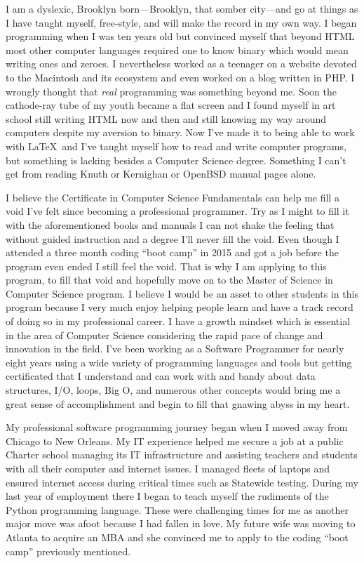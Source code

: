 \documentclass[12pt]{article}
\begin{document}
I am a dyslexic, Brooklyn born---Brooklyn, that somber city---and go at things as I have taught myself, free-style, and will make the record in my own way.
I began programming when I was ten years old but convinced myself that beyond HTML most other computer languages required one to know binary which would mean writing ones and zeroes. I nevertheless worked as a teenager on a website devoted to the Macintosh and its ecosystem and even worked on a blog written in PHP. I wrongly thought that \emph{real} programming was something beyond me. Soon the cathode-ray tube of my youth became a flat screen and I found myself in art school still writing HTML now and then and still knowing my way around computers despite my aversion to binary. Now I've made it to being able to work with \LaTeX\ and I've taught myself how to read and write computer programs, but something is lacking besides a Computer Science degree. Something I can't get from reading Knuth or Kernighan or OpenBSD manual pages alone.

I believe the Certificate in Computer Science Fundamentals can help me fill a void I've felt since becoming a professional programmer. Try as I might to fill it with the aforementioned books and manuals I can not shake the feeling that without guided instruction and a degree I'll never fill the void. Even though I attended a three month coding ``boot camp'' in 2015 and got a job before the program even ended I still feel the void. That is why I am applying to this program, to fill that void and hopefully move on to the Master of Science in Computer Science program. I believe I would be an asset to other students in this program because I very much enjoy helping people learn and have a track record of doing so in my professional career. I have a growth mindset which is essential in the area of Computer Science considering the rapid pace of change and innovation in the field. I've been working as a Software Programmer for nearly eight years using a wide variety of programming languages and tools but getting certificated that I understand and can work with and bandy about data structures, I/O, loops, Big O, and numerous other concepts would bring me a great sense of accomplishment and begin to fill that gnawing abyss in my heart.

My professional software programming journey began when I moved away from Chicago to New Orleans. My IT experience helped me secure a job at a public Charter school managing its IT infrastructure and assisting teachers and students with all their computer and internet issues. I managed fleets of laptops and ensured internet access during critical times such as Statewide testing. During my last year of employment there I began to teach myself the rudiments of the Python programming language. These were challenging times for me as another major move was afoot because I had fallen in love. My future wife was moving to Atlanta to acquire an MBA and she convinced me to apply to the coding ``boot camp'' previously mentioned.
\end{document}
